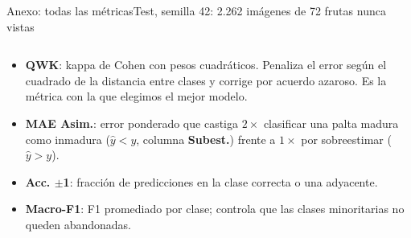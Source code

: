 \documentclass[aspectratio=169,11pt,table]{beamer}
\begin{document}
\begin{frame}{Anexo: todas las métricas}{Test, semilla 42: 2.262 imágenes de 72 frutas nunca vistas}
{\begin{tabular}{lcccccccccc}
\bottomrule
\end{tabular}
}
\vspace{0.4em}
{\tiny
\setlength{\itemsep}{0.14em}
\begin{itemize}
  \item \textbf{QWK}: kappa de Cohen con pesos cuadráticos. Penaliza el error según el cuadrado de la distancia entre clases y corrige por acuerdo azaroso. Es la métrica con la que elegimos el mejor modelo.
  \item \textbf{MAE Asim.}: error ponderado que castiga $2\times$ clasificar una palta madura como inmadura ($\hat{y} < y$, columna \textbf{Subest.}) frente a $1\times$ por sobreestimar ($\hat{y} > y$).
  \item \textbf{Acc. $\pm$1}: fracción de predicciones en la clase correcta o una adyacente.
  \item \textbf{Macro-F1}: F1 promediado por clase; controla que las clases minoritarias no queden abandonadas.
\end{itemize}
}
\end{frame}
\end{document}
